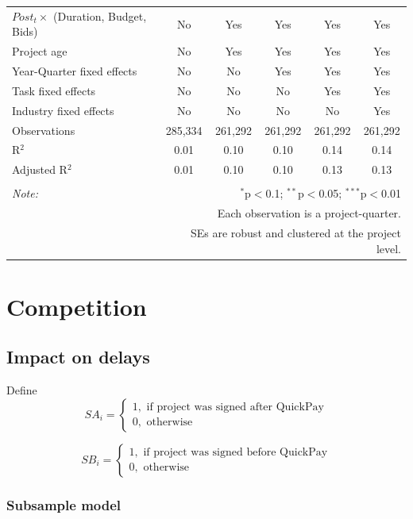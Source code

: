 \documentclass[
]{article}
\begin{document}
\begin{table}[H]
\begin{tabular}{@{\extracolsep{-2pt}}lccccc}
$Post_t \times $  (Duration, Budget, Bids) & No & Yes & Yes & Yes & Yes \\ 
Project age & No & Yes & Yes & Yes & Yes \\ 
Year-Quarter fixed effects & No & No & Yes & Yes & Yes \\ 
Task fixed effects & No & No & No & Yes & Yes \\ 
Industry fixed effects & No & No & No & No & Yes \\ 
Observations & 285,334 & 261,292 & 261,292 & 261,292 & 261,292 \\ 
R$^{2}$ & 0.01 & 0.10 & 0.10 & 0.14 & 0.14 \\ 
Adjusted R$^{2}$ & 0.01 & 0.10 & 0.10 & 0.13 & 0.13 \\ 
\hline 
\hline \\[-1.8ex] 
\textit{Note:}  & \multicolumn{5}{r}{$^{*}$p$<$0.1; $^{**}$p$<$0.05; $^{***}$p$<$0.01} \\ 
 & \multicolumn{5}{r}{Each observation is a project-quarter.} \\ 
 & \multicolumn{5}{r}{SEs are robust and clustered at the project level.} \\ 
\end{tabular} 
\end{table}

\hypertarget{competition}{%
\section{Competition}\label{competition}}

\hypertarget{impact-on-delays}{%
\subsection{Impact on delays}\label{impact-on-delays}}

Define
\[ SA_i = \begin{cases} 1, \text{ if project was signed after QuickPay}\\
0, \text{ otherwise} \end{cases}\]

\[ SB_i = \begin{cases} 1, \text{ if project was signed before QuickPay}\\
0, \text{ otherwise} \end{cases}\]

\hypertarget{subsample-model}{%
\subsubsection{Subsample model}\label{subsample-model}}
\end{document}
